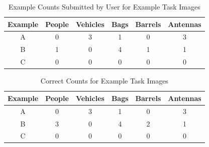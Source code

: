 \documentclass[preprint,12pt, a4paper]{elsarticle}
\begin{document}
\begin{table}[h]
\caption{Example Counts Submitted by User for Example Task Images}
\label{tab:example_counts}
\centering
\begin{tabular}{|c|c|c|c|c|c|}
    \hline

    \rowcolor[HTML]{C0C0C0} 

    \textbf{Example} & \textbf{People} & \textbf{Vehicles} & \textbf{Bags} & \textbf{Barrels} & \textbf{Antennas} \\
    \hline     \hline

    A & 0 & 3 & 1 & 0 & 3 \\
    \hline
    B & 1 & 0 & 4 & 1 & 1 \\
    \hline
    C & 0 & 0 & 0 & 0 & 0 \\
    \hline
\end{tabular}
\end{table}


\begin{table}[h]
\caption{Correct Counts for Example Task Images}
\label{tab:example_answers}
\centering
\begin{tabular}{|c|c|c|c|c|c|}
    \hline
    \rowcolor[HTML]{C0C0C0} 

    \textbf{Example} & \textbf{People} & \textbf{Vehicles} & \textbf{Bags} & \textbf{Barrels} & \textbf{Antennas} \\
    \hline    \hline

    A & 0 & 3 & 1 & 0 & 3 \\
    \hline
    B & 3 & 0 & 4 & 2 & 1 \\
    \hline
    C & 0 & 0 & 0 & 0 & 0 \\
    \hline
\end{tabular}
\end{table}
\end{document}
